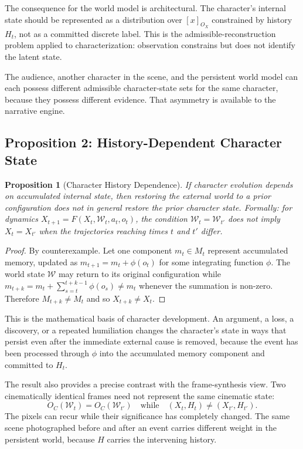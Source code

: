 \documentclass[11pt,a4paper]{article}
\theoremstyle{plain}
\newtheorem{proposition}[theorem]{Proposition}
\theoremstyle{definition}
\theoremstyle{remark}
\begin{document}
The consequence for the world model is architectural. The character's internal state should be represented as a distribution over $[x]_{O_X}$ constrained by history $H_t$, not as a committed discrete label. This is the admissible-reconstruction problem applied to characterization: observation constrains but does not identify the latent state.

The audience, another character in the scene, and the persistent world model can each possess different admissible character-state sets for the same character, because they possess different evidence. That asymmetry is available to the narrative engine.

\subsection{Proposition 2: History-Dependent Character State}

\begin{proposition}[Character History Dependence]
\label{prop:history}
If character evolution depends on accumulated internal state, then restoring the external world to a prior configuration does not in general restore the prior character state. Formally: for dynamics $X_{t+1} = F(X_t, \mathcal{W}_t, a_t, o_t)$, the condition $\mathcal{W}_t = \mathcal{W}_{t'}$ does not imply $X_t = X_{t'}$ when the trajectories reaching times $t$ and $t'$ differ.
\end{proposition}

\begin{proof}
By counterexample. Let one component $m_t \in M_t$ represent accumulated memory, updated as $m_{t+1} = m_t + \phi(o_t)$ for some integrating function $\phi$. The world state $\mathcal{W}$ may return to its original configuration while $m_{t+k} = m_t + \sum_{s=t}^{t+k-1} \phi(o_s) \neq m_t$ whenever the summation is non-zero. Therefore $M_{t+k} \neq M_t$ and so $X_{t+k} \neq X_t$.
\end{proof}

This is the mathematical basis of character development. An argument, a loss, a discovery, or a repeated humiliation changes the character's state in ways that persist even after the immediate external cause is removed, because the event has been processed through $\phi$ into the accumulated memory component and committed to $H_t$.

The result also provides a precise contrast with the frame-synthesis view. Two cinematically identical frames need not represent the same cinematic state:
\[
O_C(\mathcal{W}_t) = O_C(\mathcal{W}_{t'})
\quad\text{while}\quad
(X_t, H_t) \neq (X_{t'}, H_{t'}).
\]
The pixels can recur while their significance has completely changed. The same scene photographed before and after an event carries different weight in the persistent world, because $H$ carries the intervening history.
\end{document}
